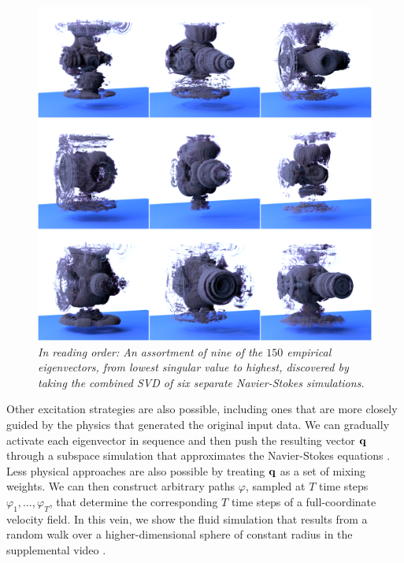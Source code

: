 \begin{figure}
	\centering
	\includegraphics[width=\textwidth]{chap5/figures/modes/montage_recolored.png}
	\caption{\em In reading order: An assortment of nine of the $150$ empirical eigenvectors, from lowest singular value to highest,  discovered by taking the combined SVD of six separate Navier-Stokes simulations.}
	\label{fig:eigs}
\end{figure}

Other excitation strategies are also possible, including ones that are more closely guided by the physics that generated the original input data. We can gradually activate each eigenvector in sequence and then push the resulting vector $\mathbf{q}$ through a subspace simulation that approximates the Navier-Stokes equations \cite{Kim2013}. Less physical approaches are also possible by treating $\mathbf{q}$ as a set of mixing weights. We can then construct arbitrary paths $\varphi$, sampled at $T$ time steps $\varphi_1, \ldots, \varphi_T$, that determine the corresponding $T$ time steps of a full-coordinate velocity field. In this vein, we show the fluid simulation that results from a random walk over a higher-dimensional sphere of constant radius in the supplemental video \cite{sphere}.

